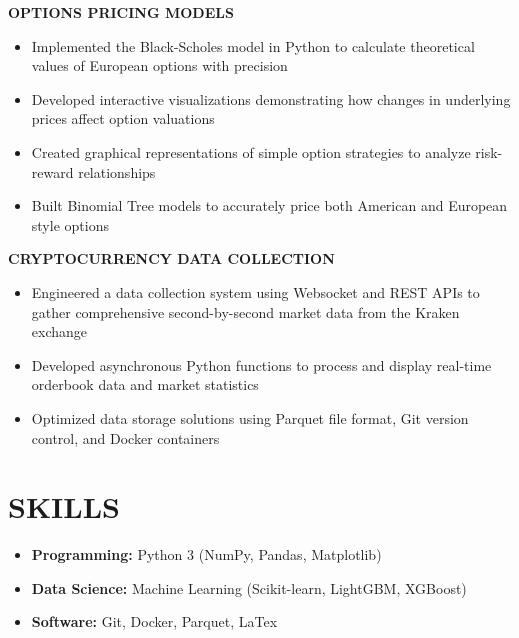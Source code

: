\documentclass[10pt,letterpaper]{article}
\begin{document}
\begin{flushleft}
  \textbf{\color{subheadingcolor}OPTIONS PRICING MODELS}
  \begin{itemize}[leftmargin=*,nosep,itemsep=2pt]
      \item Implemented the Black-Scholes model in Python to calculate theoretical values of European options with precision
      \item Developed interactive visualizations demonstrating how changes in underlying prices affect option valuations
      \item Created graphical representations of simple option strategies to analyze risk-reward relationships
      \item Built Binomial Tree models to accurately price both American and European style options
  \end{itemize}
  \end{flushleft}


\begin{flushleft}
\textbf{\color{subheadingcolor}CRYPTOCURRENCY DATA COLLECTION}
\begin{itemize}[leftmargin=*,nosep,itemsep=2pt]
    \item Engineered a data collection system using Websocket and REST APIs to gather comprehensive second-by-second market data from the Kraken exchange
    \item Developed asynchronous Python functions to process and display real-time orderbook data and market statistics
    \item Optimized data storage solutions using Parquet file format, Git version control, and Docker containers
\end{itemize}
\end{flushleft}

\vspace{0.5em}
\section{SKILLS}
\vspace{0.5em}
\begin{itemize}[leftmargin=*,nosep,itemsep=2pt]
  \item \textbf{Programming:} Python 3 (NumPy, Pandas, Matplotlib)
  \item \textbf{Data Science:} Machine Learning (Scikit-learn, LightGBM, XGBoost)
  \item \textbf{Software:} Git, Docker, Parquet, LaTex
\end{itemize}
\end{document}
